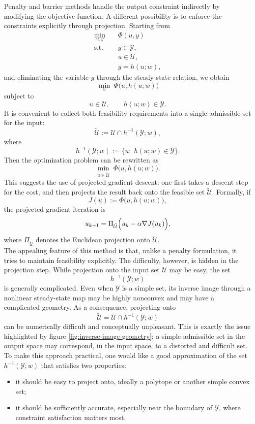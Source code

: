 Penalty and barrier methods handle the output constraint indirectly by modifying the objective function. A different possibility is to enforce the constraints explicitly through projection. Starting from
\[
\begin{aligned}
\min_{u,y}\quad & \Phi(u,y)\\
\text{s.t.}\quad & y \in \mathcal Y,\\
& u \in \mathcal U,\\
& y = h(u;w),
\end{aligned}
\]
and eliminating the variable $y$ through the steady-state relation, we obtain
\[
\min_{u} \; \Phi\bigl(u,h(u;w)\bigr)
\]
subject to
\[
u \in \mathcal U,
\qquad
h(u;w)\in\mathcal Y.
\]
It is convenient to collect both feasibility requirements into a single admissible set for the input:
\[
\tilde{\mathcal U}:=\mathcal U \cap h^{-1}(\mathcal Y;w),
\]
where
\[
h^{-1}(\mathcal Y;w)
:=
\{u:\; h(u;w)\in\mathcal Y\}.
\]
Then the optimization problem can be rewritten as
\[
\min_{u\in\tilde{\mathcal U}} \; \Phi\bigl(u,h(u;w)\bigr).
\]
This suggests the use of projected gradient descent: one first takes a descent step for the cost, and then projects the result back onto the feasible set $\tilde{\mathcal U}$. Formally, if
\[
J(u):=\Phi\bigl(u,h(u;w)\bigr),
\]
the projected gradient iteration is
\[
u_{k+1}
=
\Pi_{\tilde{\mathcal U}}
\Bigl(
u_k-\alpha \nabla J(u_k)
\Bigr),
\]
where $\Pi_{\tilde{\mathcal U}}$ denotes the Euclidean projection onto $\tilde{\mathcal U}$.\\
The appealing feature of this method is that, unlike a penalty formulation, it tries to maintain feasibility explicitly. The difficulty, however, is hidden in the projection step. While projection onto the input set $\mathcal U$ may be easy, the set
\[
h^{-1}(\mathcal Y;w)
\]
is generally complicated. Even when $\mathcal Y$ is a simple set, its inverse image through a nonlinear steady-state map may be highly nonconvex and may have a complicated geometry. As a consequence, projecting onto
\[
\tilde{\mathcal U}=\mathcal U\cap h^{-1}(\mathcal Y;w)
\]
can be numerically difficult and conceptually unpleasant. This is exactly the issue highlighted by figure \ref{fig:inverse-image-geometry}: a simple admissible set in the output space may correspond, in the input space, to a distorted and difficult set.\\

To make this approach practical, one would like a good approximation of the set $h^{-1}(\mathcal Y;w)$ that satisfies two properties:
\begin{itemize}
    \item it should be easy to project onto, ideally a polytope or another simple convex set;
    \item it should be sufficiently accurate, especially near the boundary of $\mathcal Y$, where constraint satisfaction matters most.
\end{itemize}

